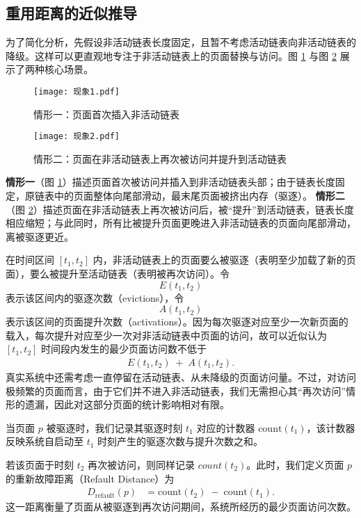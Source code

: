 \subsection{重用距离的近似推导}

为了简化分析，先假设非活动链表长度固定，且暂不考虑活动链表向非活动链表的降级。这样可以更直观地专注于非活动链表上的页面替换与访问。图 \ref{fig:现象1} 与图 \ref{fig:现象2} 展示了两种核心场景。

\begin{figure}[htbp]
  \centering
  \texttt{[image: 现象1.pdf]}
  \caption{情形一：页面首次插入非活动链表}
  \label{fig:现象1}
\end{figure}

\begin{figure}[htbp]
  \centering
  \texttt{[image: 现象2.pdf]}
  \caption{情形二：页面在非活动链表上再次被访问并提升到活动链表}
  \label{fig:现象2}
\end{figure}

\noindent
\textbf{情形一}（图 \ref{fig:现象1}）描述页面首次被访问并插入到非活动链表头部；由于链表长度固定，原链表中的页面整体向尾部滑动，最末尾页面被挤出内存（驱逐）。  
\textbf{情形二}（图 \ref{fig:现象2}）描述页面在非活动链表上再次被访问后，被“提升”到活动链表，链表长度相应缩短；与此同时，所有比被提升页面更晚进入非活动链表的页面向尾部滑动，离被驱逐更近。

在时间区间 \([t_1, t_2]\) 内，非活动链表上的页面要么被驱逐（表明至少加载了新的页面），要么被提升至活动链表（表明被再次访问）。令
\[
  E(t_1,t_2)
\]
表示该区间内的驱逐次数（evictions），令
\[
  A(t_1,t_2)
\]
表示该区间的页面提升次数（activations）。因为每次驱逐对应至少一次新页面的载入，每次提升对应至少一次对非活动链表中页面的访问，故可以近似认为 \([t_1,t_2]\) 时间段内发生的最少页面访问数不低于
\begin{align}
  \label{eq:e_plus_a}
  E(t_1,t_2) \;+\; A(t_1,t_2).
\end{align}
真实系统中还需考虑一直停留在活动链表、从未降级的页面访问量。不过，对访问极频繁的页面而言，由于它们并不进入非活动链表，我们无需担心其“再次访问”情形的遗漏，因此对这部分页面的统计影响相对有限。


当页面 \(p\) 被驱逐时，我们记录其驱逐时刻 \(t_1\) 对应的计数器 \(\mathrm{count}(t_1)\)，该计数器反映系统自启动至 \(t_1\) 时刻产生的驱逐次数与提升次数之和。

若该页面于时刻 \(t_2\) 再次被访问，则同样记录 \(count(t_2)\)。此时，我们定义页面 \(p\) 的重新故障距离（Refault Distance）为
\begin{align}
  \label{eq:refault_distance}
  D_{\mathrm{refault}}(p)
  &= 
  \mathrm{count}(t_2)
  \;-\;
  \mathrm{count}(t_1).
\end{align}
这一距离衡量了页面从被驱逐到再次访问期间，系统所经历的最少页面访问次数。




